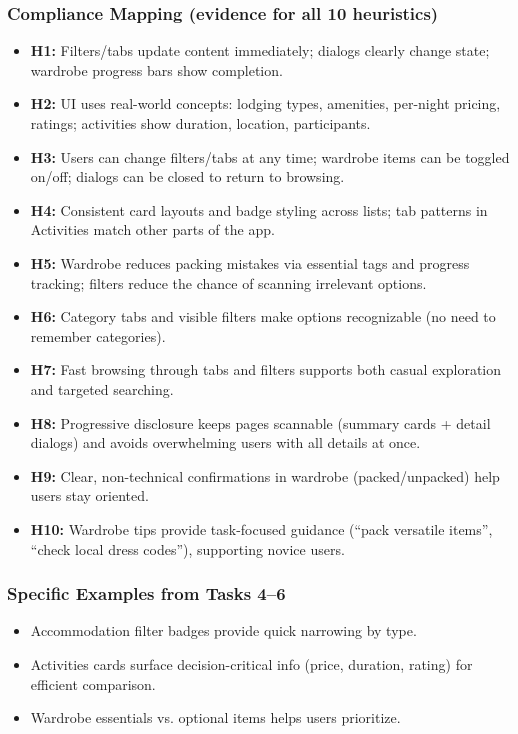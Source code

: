 \documentclass[11pt,a4paper]{article}
\begin{document}
\subsubsection{Compliance Mapping (evidence for all 10 heuristics)}
\begin{itemize}
    \item \textbf{H1:} Filters/tabs update content immediately; dialogs clearly change state; wardrobe progress bars show completion.
    \item \textbf{H2:} UI uses real-world concepts: lodging types, amenities, per-night pricing, ratings; activities show duration, location, participants.
    \item \textbf{H3:} Users can change filters/tabs at any time; wardrobe items can be toggled on/off; dialogs can be closed to return to browsing.
    \item \textbf{H4:} Consistent card layouts and badge styling across lists; tab patterns in Activities match other parts of the app.
    \item \textbf{H5:} Wardrobe reduces packing mistakes via essential tags and progress tracking; filters reduce the chance of scanning irrelevant options.
    \item \textbf{H6:} Category tabs and visible filters make options recognizable (no need to remember categories).
    \item \textbf{H7:} Fast browsing through tabs and filters supports both casual exploration and targeted searching.
    \item \textbf{H8:} Progressive disclosure keeps pages scannable (summary cards + detail dialogs) and avoids overwhelming users with all details at once.
    \item \textbf{H9:} Clear, non-technical confirmations in wardrobe (packed/unpacked) help users stay oriented.
    \item \textbf{H10:} Wardrobe tips provide task-focused guidance (``pack versatile items'', ``check local dress codes''), supporting novice users.
\end{itemize}

\subsubsection{Specific Examples from Tasks 4--6}
\begin{itemize}
    \item Accommodation filter badges provide quick narrowing by type.
    \item Activities cards surface decision-critical info (price, duration, rating) for efficient comparison.
    \item Wardrobe essentials vs. optional items helps users prioritize.
\end{itemize}
\end{document}

